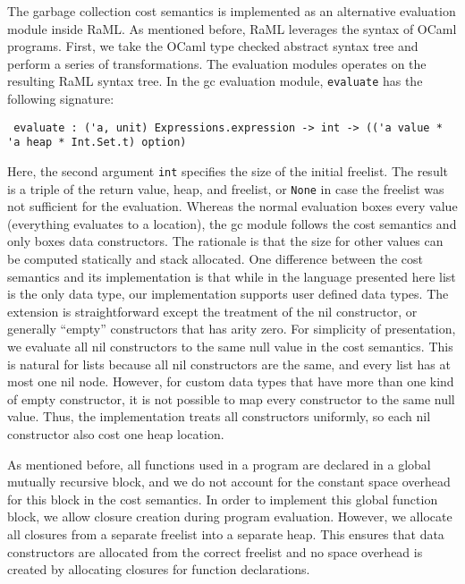 \documentclass{easychair}
\theoremstyle{definition}
\begin{document}
The garbage collection cost semantics is implemented as an alternative evaluation module inside
RaML. As mentioned before, RaML leverages the syntax of OCaml programs.
First, we take the OCaml type checked abstract syntax tree and perform a series of transformations. 
The evaluation modules operates on the resulting RaML syntax tree. 
In the gc evaluation module, \texttt{evaluate} has the following signature:
{\small%
\begin{verbatim}
 evaluate : ('a, unit) Expressions.expression -> int -> (('a value * 'a heap * Int.Set.t) option) 
\end{verbatim}
}
Here, the second argument \texttt{int} specifies the size of the initial freelist.
The result is a triple of the return value, heap, and freelist, or \texttt{None} 
in case the freelist was not sufficient for the evaluation.
Whereas the normal evaluation boxes every value (everything evaluates to a location), 
the gc module follows the cost semantics and only boxes data constructors. The rationale is
that the size for other values can be computed statically and stack allocated. One difference
between the cost semantics and its implementation is that while in the language presented here
list is the only data type, our implementation supports user defined data types. The extension
is straightforward except the treatment of the nil constructor, or generally ``empty'' constructors
that has arity zero. For simplicity of presentation, we evaluate all nil constructors to
the same null value in the cost semantics. This is natural for lists because all nil constructors 
are the same, and every list has at most one nil node. However, for custom data types that have 
more than one kind of empty constructor, it is not possible to map every constructor to the same 
null value. Thus, the implementation treats all constructors uniformly, so each nil constructor
also cost one heap location. 

As mentioned before, all functions used in a program are declared in a global mutually 
recursive block, and we do not account for the constant space overhead for this block in 
the cost semantics.  In order to implement this global function block, we allow closure creation
during program evaluation. However, we allocate all closures from a separate freelist into 
a separate heap.  This ensures that data constructors are allocated from the correct freelist 
and no space overhead is created by allocating closures for function declarations.
\end{document}
